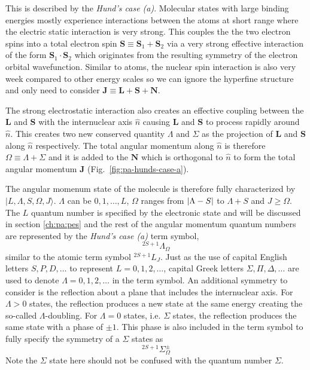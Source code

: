 This is described by the \textit{Hund's case (a)}\cite[p.~523-626]{bransden_physics_2003}.
Molecular states with large binding energies mostly experience interactions
between the atoms at short range where the electric static interaction is very strong.
This couples the the two electron spins into a total electron spin
$\mathbf{S}\equiv\mathbf{S}_1+\mathbf{S}_2$ via a very strong effective interaction
of the form $\mathbf{S}_1\cdot\mathbf{S}_2$ which originates
from the resulting symmetry of the electron orbital wavefunction.
Similar to atoms, the nuclear spin interaction is also very week compared to
other energy scales so we can ignore the hyperfine structure and only need to consider
$\mathbf{J}\equiv\mathbf{L}+\mathbf{S}+\mathbf{N}$.

The strong electrostatic interaction also creates an effective coupling
between the $\mathbf{L}$ and $\mathbf{S}$ with the internuclear axis $\hat{n}$
causing $\mathbf{L}$ and $\mathbf{S}$ to process rapidly around $\hat{n}$.
This creates two new conserved quantity $\Lambda$ and $\Sigma$
as the projection of $\mathbf{L}$ and $\mathbf{S}$
along $\hat{n}$ respectively.
The total angular momentum along $\hat{n}$ is therefore $\Omega\equiv\Lambda+\Sigma$
and it is added to the $\mathbf{N}$ which is orthogonal to $\hat{n}$ to form
the total angular momentum $\mathbf{J}$ (Fig.~\ref{fig:pa-hunds-case-a}).

The angular momenum state of the molecule is therefore fully characterized by
$|L,\Lambda,S,\Omega,J\rangle$. $\Lambda$ can be $0,1,\dots,L$, $\Omega$ ranges from
${\left|{\Lambda-S}\right|}$ to $\Lambda+S$ and $J\geqslant\Omega$.
The $L$ quantum number is specified by the electronic state and will be discussed
in section \ref{ch:pa:pes} and the rest of the angular momentum quantum numbers
are represented by the \textit{Hund's case (a)} term symbol,
\[ ^{2S+1}\Lambda_\Omega \]
similar to the atomic term symbol $^{2S+1}L_J$.
Just as the use of capital English letters $S,P,D,\dots$ to represent
$L=0,1,2,\dots$, capital Greek letters $\Sigma,\Pi,\Delta,\dots$ are used
to denote $\Lambda=0,1,2,\dots$ in the term symbol.
An additional symmetry to consider is the reflection about a plane that includes
the internuclear axis.
For $\Lambda>0$ states, the reflection produces a new state at the same energy
creating the so-called $\Lambda$-doubling. For $\Lambda=0$ states, i.e. $\Sigma$ states,
the reflection produces the same state with a phase of $\pm1$.
This phase is also included in the term symbol to fully specify the symmetry of
a $\Sigma$ states as
\[ ^{2S+1}\Sigma_\Omega^{\pm} \]
Note the $\Sigma$ state here should not be confused with the quantum number $\Sigma$.

